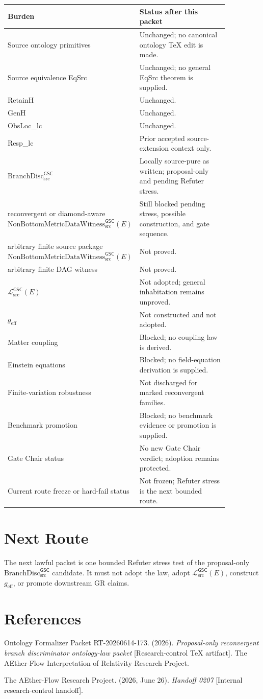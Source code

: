 \documentclass[11pt]{article}
\newcommand{\Witness}{\mathrm{NonBottomMetricDataWitness}_{\mathrm{src}}^{\mathsf{GSC}}}
\newcommand{\MetricData}{\mathcal{L}_{\mathrm{src}}^{\mathsf{GSC}}}
\newcommand{\geff}{g_{\mathrm{eff}}}
\newcommand{\BranchDisc}{\mathrm{BranchDisc}_{\mathrm{src}}^{\mathsf{GSC}}}
\begin{document}
\begin{longtable}{p{0.30\linewidth}p{0.56\linewidth}}
\toprule
Burden & Status after this packet \\
\midrule
Source ontology primitives & Unchanged; no canonical ontology TeX edit is made. \\
Source equivalence EqSrc & Unchanged; no general EqSrc theorem is supplied. \\
RetainH & Unchanged. \\
GenH & Unchanged. \\
ObsLoc\_lc & Unchanged. \\
Resp\_lc & Prior accepted source-extension context only. \\
\(\BranchDisc\) & Locally source-pure as written; proposal-only and pending
Refuter stress. \\
reconvergent or diamond-aware \(\Witness(E)\) & Still blocked pending
stress, possible construction, and gate sequence. \\
arbitrary finite source package \(\Witness(E)\) & Not proved. \\
arbitrary finite DAG witness & Not proved. \\
\(\MetricData(E)\) & Not adopted; general inhabitation remains unproved. \\
\(\geff\) & Not constructed and not adopted. \\
Matter coupling & Blocked; no coupling law is derived. \\
Einstein equations & Blocked; no field-equation derivation is supplied. \\
Finite-variation robustness & Not discharged for marked reconvergent families. \\
Benchmark promotion & Blocked; no benchmark evidence or promotion is supplied. \\
Gate Chair status & No new Gate Chair verdict; adoption remains protected. \\
Current route freeze or hard-fail status & Not frozen; Refuter stress is the
next bounded route. \\
\bottomrule
\end{longtable}

\section{Next Route}

The next lawful packet is one bounded Refuter stress test of the proposal-only
\(\BranchDisc\) candidate. It must not adopt the law, adopt \(\MetricData(E)\),
construct \(\geff\), or promote downstream GR claims.

\section*{References}

Ontology Formalizer Packet RT-20260614-173. (2026). \textit{Proposal-only
reconvergent branch discriminator ontology-law packet} [Research-control TeX
artifact]. The AEther-Flow Interpretation of Relativity Research Project.

The AEther-Flow Research Project. (2026, June 26). \textit{Handoff 0207}
[Internal research-control handoff].
\end{document}
